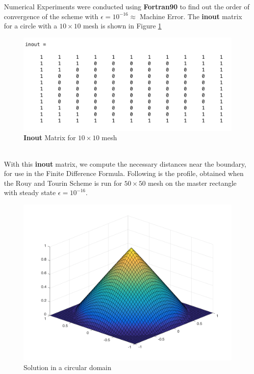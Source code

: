 \documentclass[11pt]{report}
\begin{document}
\noindent
Numerical Experiments were conducted using \textbf{Fortran90} to find out the order of convergence of the scheme with $\epsilon = 10^{-16} \approx$ Machine Error. The \textbf{inout} matrix for a circle with a $10 \times 10$ mesh is shown in Figure \ref{fig:4}
\begin{figure}[h!]
	\centering
	\includegraphics[scale=0.5]{inout.png}
	\caption{\textbf{Inout} Matrix for $10 \times 10$ mesh}
	\label{fig:4}
\end{figure}\\
\noindent
With this \textbf{inout} matrix, we compute the necessary distances near the boundary, for use in the Finite Difference Formula. Following is the profile, obtained when the Rouy and Tourin Scheme is run for $50 \times 50$ mesh on the master rectangle with steady state $\epsilon = 10^{-16}$.
\begin{figure}[h!]
	\centering
	\includegraphics[scale = 0.3]{circle.png}
	\caption{Solution in a circular domain}
	\label{fig:5}
\end{figure}\\
\end{document}
